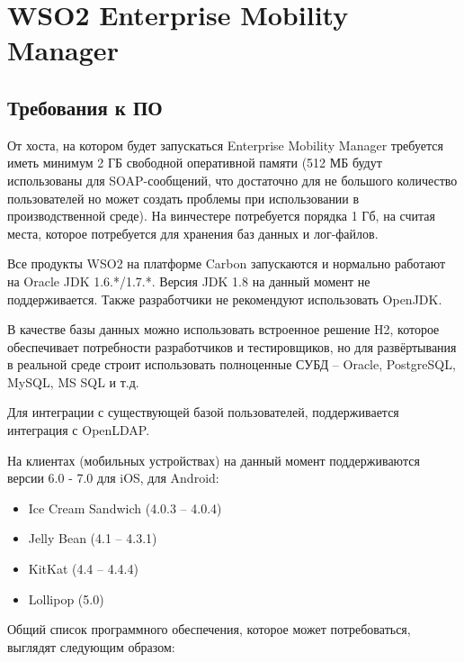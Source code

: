 \documentclass[a4paper, 12pt]{article}		%
\begin{document}
\section{WSO2 Enterprise Mobility Manager}

\subsection{Требования к ПО}

От хоста, на котором будет запускаться Enterprise Mobility Manager требуется иметь минимум 2 ГБ свободной оперативной памяти (512 МБ будут использованы для SOAP-сообщений, что достаточно для не большого количество пользователей но может создать проблемы при использовании в производственной среде). На винчестере потребуется порядка 1 Гб, на считая места, которое потребуется для хранения баз данных и лог-файлов.

Все продукты WSO2 на платформе Carbon запускаются и нормально работают на Oracle JDK 1.6.*/1.7.*. Версия JDK 1.8 на данный момент не поддерживается. Также разработчики не рекомендуют использовать OpenJDK.

В качестве базы данных можно использовать встроенное решение H2, которое обеспечивает потребности разработчиков и тестировщиков, но для развёртывания в реальной среде строит использовать полноценные СУБД -- Oracle, PostgreSQL, MySQL, MS SQL и т.д.

Для интеграции с существующей базой пользователей, поддерживается интеграция с OpenLDAP.

На клиентах (мобильных устройствах) на данный момент поддерживаются версии 6.0 - 7.0 для iOS, для Android:
\begin{itemize}
\item Ice Cream Sandwich (4.0.3 – 4.0.4)
\item Jelly Bean (4.1 – 4.3.1)
\item KitKat (4.4 – 4.4.4)
\item Lollipop (5.0)
\end{itemize}

Общий список программного обеспечения, которое может потребоваться, выглядят следующим образом:
\end{document}
